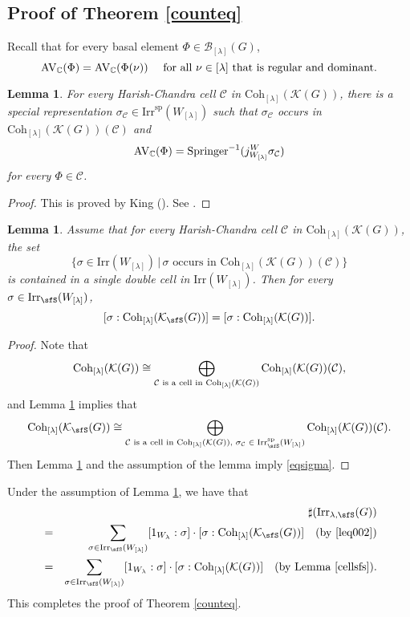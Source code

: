 \documentclass[12pt,a4paper]{amsart}
\newcommand{\CC}{{\mathcal {C}}}
\newcommand{\CK}{{\mathcal {K}}}
\newcommand{\be}{\begin {equation}}
\newcommand{\ee}{\end {equation}}
\numberwithin{equation}{section}
\newtheorem{lem}[thm]{Lemma}
\theoremstyle{remark}
\def\Irr{\mathrm{Irr}}
\def\Coh{\mathrm{Coh}}
\newcommand{\Lam}{{[\lambda]}}
\begin{document}
\subsection{Proof of Theorem \ref{counteq}}  Recall that for every basal element $\Phi\in \mathcal B_\Lam(G)$,
\[
   \mathrm{AV}_\C(\Phi)= \mathrm{AV}_\C(\Phi(\nu))\quad \textrm{ for all $\nu\in \Lam$ that is regular and dominant}.
\]


\begin{lem}\label{hcgodie}
For every Harish-Chandra cell $\CC$ in $\Coh_{[\lambda]}(\CK(G))$, there is a special representation $\sigma_\CC\in \Irr^{\mathrm{sp}}(W_\Lam)$ such that $\sigma_\CC$ occurs in $\Coh_{[\lambda]}(\CK(G))(\CC)$ and
\[
  \mathrm{AV}_\C(\Phi)=\mathrm{Springer}^{-1}(j_{W_\Lam}^W \sigma_\CC)
\]
for every $\Phi\in \CC$.
\end{lem}
\begin{proof}
This is proved by King (\cite{King}). See \cite[Corollary 14.11]{V4}.
\end{proof}

\begin{lem}\label{cellsfs}
Assume that for every Harish-Chandra cell $\CC$ in $\Coh_{\Lam}(\CK(G))$, the set
\[
\{\sigma\in \Irr(W_{[\lambda]})\,|\, \textrm{$\sigma$ occurs in $\Coh_{\Lam}(\CK(G))(\CC)$}\}
\]
is contained in a single double cell in $\Irr(W_\Lam)$. Then for every $\sigma\in \Irr_\sfS(W_\Lam)$,
\be\label{eqsigma}
[ \sigma: \Coh_{\Lam}(\CK_\sfS(G))]=[\sigma:\Coh_{\Lam}(\CK(G))].
\ee
\end{lem}
\begin{proof}
Note that
\[
  \Coh_{\Lam}(\CK(G))\\
   \cong \bigoplus_{\CC \textrm{ is a cell in $\Coh_{\Lam}(\CK(G))$}} \Coh_{\Lam}(\CK(G))(\CC),
\]
and
 Lemma \ref{hcgodie} implies that
 \[
   \Coh_{\Lam}(\CK_\sfS(G))\cong  \bigoplus_{\CC \textrm{ is a cell in $\Coh_{\Lam}(\CK(G))$, $\sigma_\CC\in \Irr^{\mathrm{sp}}_\sfS(W_\Lam)$}} \Coh_{\Lam}(\CK(G))(\CC).
 \]
Then Lemma \ref{hcgodie}  and the assumption of the lemma imply \eqref{eqsigma}. \end{proof}

Under the assumption of Lemma \ref{cellsfs}, we have that
\begin{eqnarray*}
   && \sharp(\Irr_{\lambda,\sfS}(G)) \\
   &=&  \sum_{\sigma \in \Irr_\sfS(W_\Lam)} [1_{W_{\lambda}}: \sigma]\cdot [\sigma:\Coh_{\Lam}(\CK_\sfS(G))]   \quad (\textrm{by \eqref{leq002}})\\
    &= & \sum_{\sigma \in \Irr_\sfS(W_\Lam)} [1_{W_{\lambda}}: \sigma]\cdot [\sigma:\Coh_{\Lam}(\CK(G))]   \quad (\textrm{by Lemma \ref{cellsfs}}).\\
\end{eqnarray*}
This completes the proof of Theorem \ref{counteq}.
\end{document}
